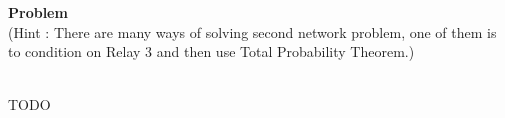 \documentclass[12pt]{article}
\newenvironment{Ex}{\textbf{Problem}\vspace{.75em}\\}{}
\begin{document}
\begin{enumerate}
\begin{Ex}
      (Hint : There are many ways of solving second network problem,
      one of them is to condition on Relay 3 and then use Total
      Probability Theorem.)
      \begin{solution} \hfill \\
        {\huge TODO}
      \end{solution}
    \end{Ex}
\end{enumerate}
\end{document}
